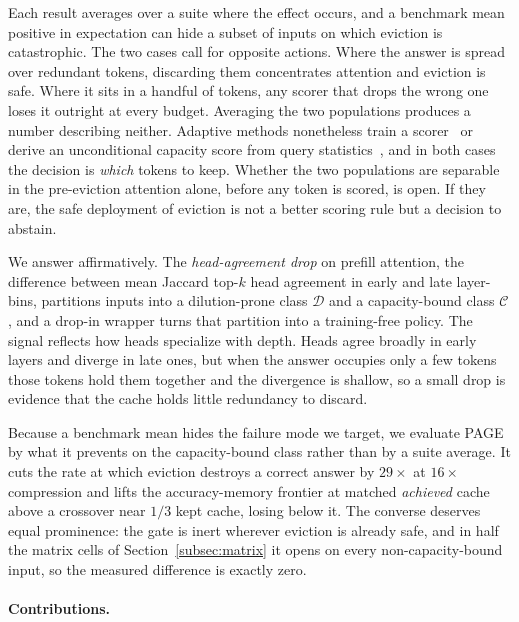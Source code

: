 \documentclass{article}
\newcommand{\method}{PAGE\xspace}
\begin{document}
Each result averages over a suite where the effect occurs, and a benchmark
mean positive in expectation can hide a subset of inputs on which eviction is
catastrophic. The two cases call for opposite actions. Where the answer is
spread over redundant tokens, discarding them concentrates attention and
eviction is safe. Where it sits in a handful of tokens, any scorer that drops
the wrong one loses it outright at every budget. Averaging the two populations
produces a number describing neither. Adaptive methods nonetheless train a
scorer~\citep{arxiv260509649, arxiv260525475, arxiv260203203, arxiv260210238}
or derive an unconditional capacity score from query
statistics~\citep{arxiv260425975}, and in both cases the decision is
\emph{which} tokens to keep. Whether the two populations are separable in the
pre-eviction attention alone, before any token is scored, is open. If they are,
the safe deployment of eviction is not a better scoring rule but a decision to
abstain.

We answer affirmatively. The \emph{head-agreement drop} on prefill attention,
the difference between mean Jaccard top-$k$ head agreement in early and late
layer-bins, partitions inputs into a dilution-prone class $\mathcal{D}$ and a
capacity-bound class $\mathcal{C}$, and a drop-in wrapper turns that partition
into a training-free policy. The signal reflects how heads specialize with depth. Heads agree broadly in
early layers and diverge in late ones, but when the answer occupies only a few
tokens those tokens hold them together and the divergence is shallow, so a
small drop is evidence that the cache holds little redundancy to discard.

Because a benchmark mean hides the failure mode we target, we evaluate \method
by what it prevents on the capacity-bound class rather than by a suite
average. It cuts the rate at which eviction destroys a correct answer by
$29\times$ at $16\times$ compression and lifts the accuracy-memory frontier at
matched \emph{achieved} cache above a crossover near $1/3$ kept cache, losing
below it. The converse deserves equal prominence: the gate is inert wherever
eviction is already safe, and in half the matrix cells of
Section~\ref{subsec:matrix} it opens on every non-capacity-bound input, so the
measured difference is exactly zero.

\paragraph{Contributions.}
\end{document}
